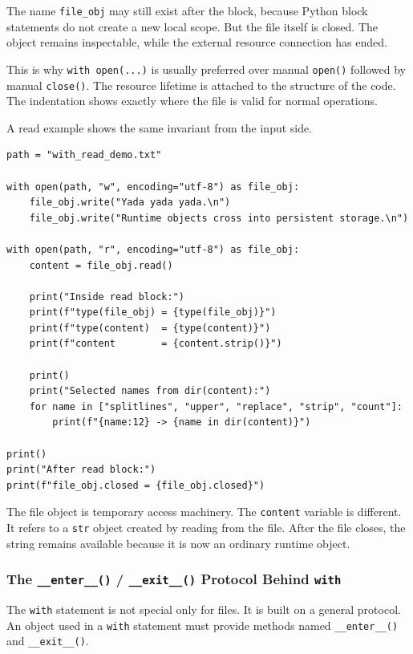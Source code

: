 The name \texttt{file\_obj} may still exist after the block, because Python block statements do not create a new local scope. But the file itself is closed. The object remains inspectable, while the external resource connection has ended.

This is why \texttt{with open(...)} is usually preferred over manual \texttt{open()} followed by manual \texttt{close()}. The resource lifetime is attached to the structure of the code. The indentation shows exactly where the file is valid for normal operations.

A read example shows the same invariant from the input side.

\begin{verbatim}
path = "with_read_demo.txt"

with open(path, "w", encoding="utf-8") as file_obj:
    file_obj.write("Yada yada yada.\n")
    file_obj.write("Runtime objects cross into persistent storage.\n")

with open(path, "r", encoding="utf-8") as file_obj:
    content = file_obj.read()

    print("Inside read block:")
    print(f"type(file_obj) = {type(file_obj)}")
    print(f"type(content)  = {type(content)}")
    print(f"content        = {content.strip()}")

    print()
    print("Selected names from dir(content):")
    for name in ["splitlines", "upper", "replace", "strip", "count"]:
        print(f"{name:12} -> {name in dir(content)}")

print()
print("After read block:")
print(f"file_obj.closed = {file_obj.closed}")
\end{verbatim}

The file object is temporary access machinery. The \texttt{content} variable is different. It refers to a \texttt{str} object created by reading from the file. After the file closes, the string remains available because it is now an ordinary runtime object.

\subsubsection{The \texttt{\_\_enter\_\_()} / \texttt{\_\_exit\_\_()} Protocol Behind \texttt{with}}

The \texttt{with} statement is not special only for files. It is built on a general protocol. An object used in a \texttt{with} statement must provide methods named \texttt{\_\_enter\_\_()} and \texttt{\_\_exit\_\_()}.

